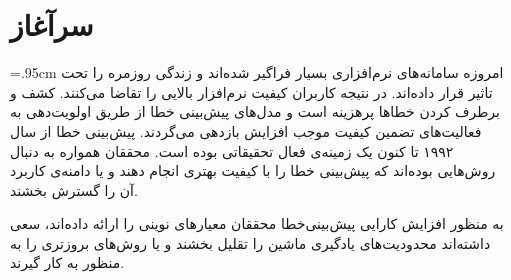 	
\chapter{سرآغاز}
\baselineskip=.95cm
امروزه سامانه‌های نرم‌افزاری بسیار فراگیر شده‌اند و زندگی روزمره را تحت تاثیر قرار داده‌اند. در نتیجه کاربران کیفیت نرم‌افزار بالایی را تقاضا می‌کنند. کشف و برطرف کردن خطاها پرهزینه است و مدل‌های پیش‌بینی خطا  از طریق اولویت‌دهی به فعالیت‌های تضمین کیفیت موجب افزایش بازدهی می‌گردند. پیش‌بینی خطا از سال ۱۹۹۲ تا کنون یک زمینه‌ی فعال تحقیقاتی بوده است. محققان همواره به دنبال روش‌هایی بوده‌اند که پیش‌بینی خطا را با کیفیت بهتری انجام دهند و یا دامنه‌ی کاربرد آن را گسترش بخشند. 

به  منظور افزایش کارایی پیش‌بینی‌خطا محققان معیارهای نوینی را ارائه داده‌اند\cite{bacchelli2010popular}، سعی داشته‌اند محدودیت‌های یادگیری ماشین را تقلیل بخشند\cite{limsettho2018cross} و یا روش‌های بروزتری را به منظور  به کار گیرند\cite{chen2016software}. 

